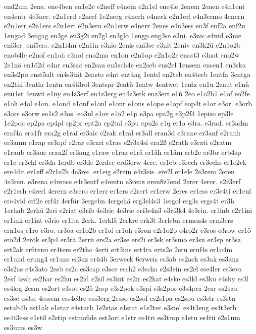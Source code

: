 {end2um
2ene.
ene4ben
en1e2c
e2neff
e4nein
e2n1el
ene4le
2enem
2enen
e4n1ent
en4entr
4e3ner.
e2n1erd
e2nerf
1e2nerg
e4nerh
e4nerk
e2n1erl
e4n3ermo
4enern
e2n1err
e2n1ers
e2n1ert
e2n3eru
e2n1erw
e4nerz
2enes
e4n3ess
en3f
enf2a
enf2u
1engad
3engag
en3ge
en3g2i
en2gl
en3glo
1engp
eng3se
e3ni.
e3nic
e4nid
e3nie
eni3er.
eni5ers.
e2n1i4m
e2n1in
e3nio
2enis
eni3se
e3nit
2eniv
en3k2ü
e2n1o2b
enob4le
e2nof
en1oh
e3nol
eno2ma
en1on
e2n1op
e2n1o2r
enost3
e3not
eno2w
2e1nö
en1ö2d
e4nr
en3sac
en2sau
en5sch4e
en2seb
ens2el
1ensem
ensen1
en3ska
en3s2po
enst5alt
en4s3tät
2ensto
e4nt
ent4ag
1entd
en2teb
en4terb
1entfa
3entga
en2thi
3entla
1entn
en4t3rol
3entspr
2entü
1entw
4entwet
1entz
en1u
2enut
e1nü
enü1st
4enwü
e1ny
en4z3erf
en4z3erg
en4z3erk
enz3ert
e1ñ
2eo
e1o2b1
e1of
eo2fe
e1oh
e4ol
e1on.
e1ond
e1onf
e1onl
e1onr
e1ons
e1ope
e1opf
eop4t
e1or
e3or.
e3orb
e3ors
e3orw
eo1s2
e3os.
eo3ul
e1ov
e1ö2
e1p
e3pa
epa2g
e3p2f4
1episo
ep3le
1e2poc
ep2pa
ep4pl
ep2pr
ept2a
ep2tal
e3pu
epu2s
e1q
er1a
e3ra.
e3rad.
er3adm
eraf4a
era1fr
era2g
e1rai
er3aic
e2rak
e1ral
er3all
eran3d
e3rane
er3anf
e2ranh
er3anm
e1rap
er3apf
e2rar
e3rari
e1ras
e2r3a4si
era2ß
e2rath
e3rati
e2ratm
e1raub
er3aue
erau2f
er3aug
e1raw
e1raz
e1rä
er1äh
er1äm
erb2e
er3br
erb4sp
er1c
er3chl
er3da
1erdb
er3de
2erdec
erd3erw
4ere.
er1eb
e3rech
er3echs
er1e2ck
ere4dit
er1eff
e2r1e2h
4e3rei.
er1eig
e2rein
e4r3eis.
ere2l
er1ele
2e3rem
2eren
4e3ren.
e3rena
e4rense
e4r3entf
e4rentn
e3renz
eren8z7end
2erer
4erer.
e2r3erf
e2r1erh
e4rerl
4erern
e3rero
er1err
er1ers
e2rert
er1erw
2eres
er1ess
er3e4ti
er1eul
ere4vid
erf2e
erf4r
4erfür
3ergebn
4ergehä
erg3el4s3
1ergol
erg3s
ergs4t
er3h
1erhab
2erhü
2eri
e2riat
e3rib
4e3ric
4e3rie
eri3e4n3
e3ri3k4
4e3rin.
er1inb
e2r1ini
er1ink
er1int
e3rio
er1ita
2erk.
1erklä
2erkre
erk3t
3erlebn
ermen4s
erm3ers
ern1os
e1ro
e3ro.
er3oa
er1o2b
er1of
er1oh
e3ron
e2r1o2p
e4ro2r
e3ros
e3row
er1ö
erö2d
2erök
er3p4
er3rä
2errü
ers2a
er3se
ers2i
er3sk
er3smo
er3sn
er3sp
er3sz
ert2ak
er6terei
er4ters
er2tho
4erti
ert3ins
ert4ra
erts2e
2eru
eruf4s
er1u4m
er1und
erung4
er1uns
er3uz
erü4b
3erweck
6erweis
es3ab
es2ach
es3ak
es3anz
e3s2as
e4s3ato
2esb
es2c
es3cap
e3sce
esch2
e3scha
e2s3ein
es2el
ese4ler
es3eva
2esf
4esh
es2har
es2hu
es2id
e2sil
es3int
es2ir
es2kat
e4ske
es3kl
es3ku
e4sky
es3l
es4log
2esm
es2ort
e3sot
es2ö
2esp
e3s2pek
e3spi
e3s2por
e3s4pra
2esr
es2sau
es3sc
es3se
4essem
ess4e3re
ess3erg
2esso
es2sof
es2s1pa
es2spu
es3str
es3stu
estab4b
est1ak
e1star
e4starb
1e2stas
e1stat
e1s2tec
e3stel
es4t3eng
es4t3erh
es4t3ess
e1stil
e2stip
estmo6de
est3ori
e1str
es4tri
es3trop
e1stu
es4tü
e2s1um
es3ums
es3w
}
